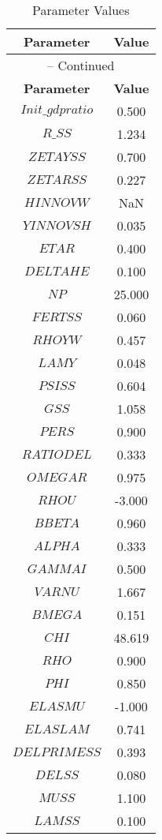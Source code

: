 \begin{center}
\begin{longtable}{cc}
\caption{Parameter Values}\\%
\toprule%
\multicolumn{1}{c}{\textbf{Parameter}} &
\multicolumn{1}{c}{\textbf{Value}}  \\%
\midrule%
\endfirsthead
\multicolumn{2}{c}{{\tablename} \thetable{} -- Continued}\\%
\midrule%
\multicolumn{1}{c}{\textbf{Parameter}} &
\multicolumn{1}{c}{\textbf{Value}} \\%
\midrule%
\endhead
$Init\_gdpratio$ 	 & 	 0.500 \\
$R\_SS$ 	 & 	 1.234 \\
$ZETAYSS$ 	 & 	 0.700 \\
$ZETARSS$ 	 & 	 0.227 \\
$HINNOVW$ 	 & 	  NaN \\
$YINNOVSH$ 	 & 	 0.035 \\
$ETAR$ 	 & 	 0.400 \\
$DELTAHE$ 	 & 	 0.100 \\
$NP$ 	 & 	 25.000 \\
$FERTSS$ 	 & 	 0.060 \\
$RHOYW$ 	 & 	 0.457 \\
$LAMY$ 	 & 	 0.048 \\
$PSISS$ 	 & 	 0.604 \\
$GSS$ 	 & 	 1.058 \\
$PERS$ 	 & 	 0.900 \\
$RATIODEL$ 	 & 	 0.333 \\
$OMEGAR$ 	 & 	 0.975 \\
$RHOU$ 	 & 	 -3.000 \\
$BBETA$ 	 & 	 0.960 \\
$ALPHA$ 	 & 	 0.333 \\
$GAMMAI$ 	 & 	 0.500 \\
$VARNU$ 	 & 	 1.667 \\
$BMEGA$ 	 & 	 0.151 \\
$CHI$ 	 & 	 48.619 \\
$RHO$ 	 & 	 0.900 \\
$PHI$ 	 & 	 0.850 \\
$ELASMU$ 	 & 	 -1.000 \\
$ELASLAM$ 	 & 	 0.741 \\
$DELPRIMESS$ 	 & 	 0.393 \\
$DELSS$ 	 & 	 0.080 \\
$MUSS$ 	 & 	 1.100 \\
$LAMSS$ 	 & 	 0.100 \\

\end{longtable}
\end{center}
